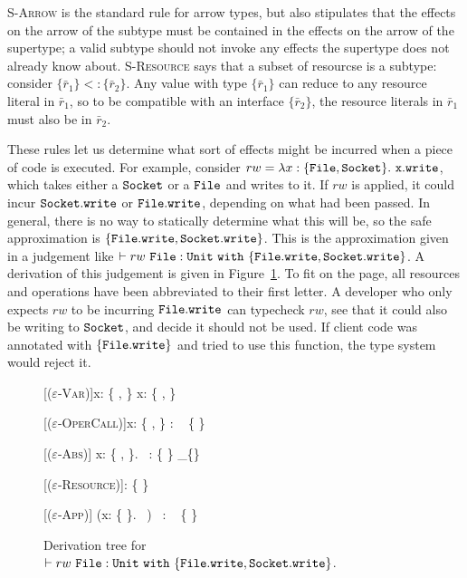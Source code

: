 \textsc{S-Arrow} is the standard rule for arrow types, but also stipulates that the effects on the arrow of the subtype must be contained in the effects on the arrow of the supertype; a valid subtype should not invoke any effects the supertype does not already know about. \textsc{S-Resource} says that a subset of resourcse is a subtype: consider $\{ \bar r_1 \} <: \{ \bar r_2 \}$. Any value with type $\{ \bar r_1 \}$ can reduce to any resource literal in $\bar r_1$, so to be compatible with an interface $\{ \bar r_2 \}$, the resource literals in $\bar r_1$ must also be in $\bar r_2$.

These rules let us determine what sort of effects might be incurred when a piece of code is executed. For example, consider $rw = \lambda x: \{ \mathtt{File, Socket} \}.~\mathtt{x.write}$, which takes either a $\mathtt{Socket}$ or a $\mathtt{File}$ and writes to it. If $rw$ is applied, it could incur $\mathtt{Socket.write}$ or $\mathtt{File.write}$, depending on what had been passed. In general, there is no way to statically determine what this will be, so the safe approximation is $\{ \mathtt{File.write, Socket.write} \}$. This is the approximation given in a judgement like $\vdash rw~\mathtt{File}: \mathtt{Unit}~\mathtt{with}~ \{ \mathtt{File.write, Socket.write} \}$. A derivation of this judgement is given in Figure~\ref{fig:opercalc_tree}. To fit on the page, all resources and operations have been abbreviated to their first letter. A developer who only expects $rw$ to be incurring $\mathtt{File.write}$ can typecheck $rw$, see that it could also be writing to $\mathtt{Socket}$, and decide it should not be used. If client code was annotated with $\mathtt{ \{ \mathtt{File.write} \} }$ and tried to use this function, the type system would reject it.

\begin{figure}[h]


    \begin{prooftree*}

    		[\textsc{($\varepsilon$-Var)}]{x: \{ ,  \} \vdash x: \{ ,  \}}
    		
    		[\textsc{($\varepsilon$-OperCall)}]{x: \{ ,  \} \vdash {} : \Unit~ \{  \} }
    		
    		[\textsc{($\varepsilon$-Abs)}]{ \lambda x: \{ ,  \}.~ : \{  \} \rightarrow_{\{\}} \Unit~ \varnothing }
    		
    
       [\textsc{($\varepsilon$-Resource)}]{\vdash {}: \{  \}~ \varnothing}
    
    		[\textsc{($\varepsilon$-App)}]{ \vdash (\lambda x: \{  \}. ~)~ : \Unit~ \{  \}  }
    		
 	\end{prooftree*}
 	
\vspace{-12pt}
\caption{Derivation tree for $\vdash rw~\mathtt{File}: \mathtt{Unit}~\mathtt{with}~ \{ \mathtt{File.write, Socket.write} \}$.}
\label{fig:opercalc_tree}
\end{figure}

